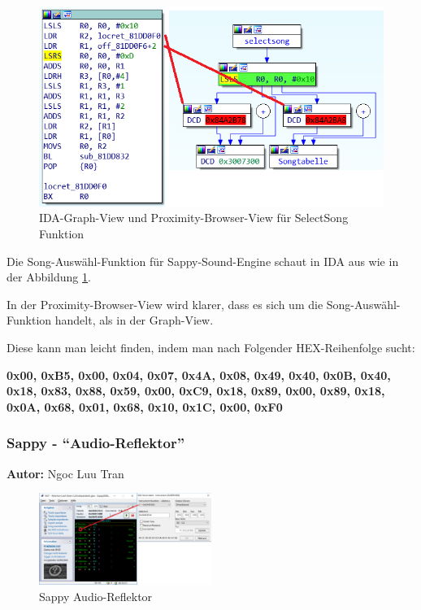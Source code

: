 \documentclass[11pt,a4paper]{scrartcl}
\newcommand{\AutorNgoc} {
    \vspace{-4mm}
    \large \textbf{Autor:} Ngoc Luu Tran \normalsize
    \vspace{2mm}
}
\begin{document}
\vspace{15pt}
\begin{figure}
	\vspace{-10pt}
	\centering
		\includegraphics[width=0.75\linewidth]{SelectSong}
	\vspace{-10pt}
	\caption{IDA-Graph-View und Proximity-Browser-View f\"{u}r SelectSong Funktion}
	\label{fig:SelectSong}
\end{figure}

Die Song-Ausw\"{a}hl-Funktion f\"{u}r Sappy-Sound-Engine schaut in IDA aus wie in der Abbildung \ref{fig:SelectSong}. 

In der Proximity-Browser-View wird klarer, dass es sich um die Song-Ausw\"{a}hl-Funktion handelt, als in der Graph-View.

Diese kann man leicht finden, indem man nach Folgender HEX-Reihenfolge sucht:

\textbf{0x00, 0xB5, 0x00, 0x04, 0x07, 0x4A, 0x08, 0x49,
0x40, 0x0B, 0x40, 0x18, 0x83, 0x88, 0x59, 0x00,
0xC9, 0x18, 0x89, 0x00, 0x89, 0x18, 0x0A, 0x68,
0x01, 0x68, 0x10, 0x1C, 0x00, 0xF0}

\newpage

\subsubsection{Sappy - "`Audio-Reflektor"'}
\AutorNgoc

\begin{figure}[h]
    \centering
    \includegraphics[width=0.5\textwidth]{Sappy}
    \caption{Sappy Audio-Reflektor}
    \label{fig:Sappy}
\end{figure}
\end{document}
